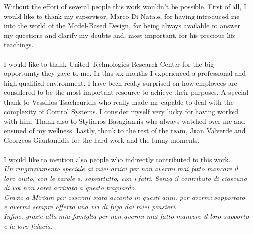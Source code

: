 
\begin{acknowledgements}      

Without the effort of several people this work wouldn't be possible. First of all, I would like to thank my supervisor, Marco Di Natale, for having introduced me into the world of the Model-Based Design, for being always available to answer my questions and clarify my doubts and, most important, for his precious life teachings.

\paragraph{} I would like to thank United Technologies Research Center for the big opportunity they gave to me. In this six months I experienced a professional and high qualified environment. I have been really surprised on how employees are considered to be the most important resource to achieve their purposes. A special thank to Vassilios Tsachouridis who really made me capable to deal with the complexity of Control Systems. I consider myself very lucky for having worked with him. Thank also to Stylianos Basagiannis who always watched over me and ensured of my wellness. Lastly, thank to the rest of the team, Juan Valverde and Georgeos Giantamidis for the hard work and the funny moments.

\paragraph{} I would like to mention also people who indirectly contributed to this work.
\\
\textit{Un ringraziamento speciale ai miei amici per non avermi mai fatto mancare il loro aiuto, con le parole e, soprattutto, con i fatti. Senza il contributo di ciascuno di voi non sarei arrivato a questo traguardo.
\\
Grazie a Miriam per essermi stata accanto in questi anni, per avermi sopportato e avermi sempre offerto una via di fuga dai miei pensieri.
\\
Infine, grazie alla mia famiglia per non avermi mai fatto mancare il loro supporto e la loro fiducia.}

{\raggedleft\vfill\itshape{}\par
}


\end{acknowledgements}
